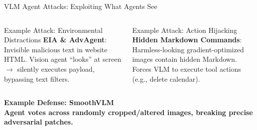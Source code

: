 \begin{frame}{VLM Agent Attacks: Exploiting What Agents See}
  \begin{columns}[T]
    \begin{ucrcard}[UCRnavy]{Example Attack: Environmental Distractions}
      \scriptsize
      \textbf{EIA \& AdvAgent}:\\
      Invisible malicious text in website HTML. Vision agent ``looks'' at screen $\to$ silently executes payload, bypassing text filters.
    \end{ucrcard}

    \begin{ucrcard}[UCRnavy]{Example Attack: Action Hijacking}
      \scriptsize
      \textbf{Hidden Markdown Commands}:\\
      Harmless-looking gradient-optimized images contain hidden Markdown. Forces VLM to execute tool actions (e.g., delete calendar).
    \end{ucrcard}
  \end{columns}

  \vspace{0.3em}
  \begin{ucrinfo}
    \centering\scriptsize\bfseries Example Defense: SmoothVLM\\[2pt]
    \normalfont\scriptsize
    Agent votes across randomly cropped/altered images, breaking precise adversarial patches.
  \end{ucrinfo}
\end{frame}


